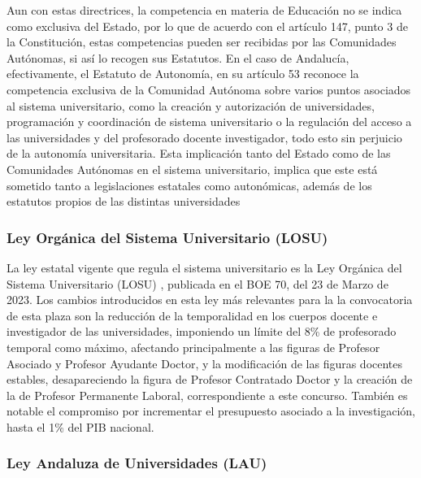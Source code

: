 \documentclass[a4paper,12pt,twoside]{article}
\begin{document}
Aun con estas directrices, la competencia en materia de Educación no se indica como exclusiva del Estado, por lo que de acuerdo con el artículo 147, punto 3 de la Constitución, estas competencias pueden ser recibidas por las Comunidades Autónomas, si así lo recogen sus Estatutos. En el caso de Andalucía, efectivamente, el Estatuto de Autonomía, en su artículo 53 reconoce la competencia exclusiva de la Comunidad Autónoma sobre varios puntos asociados al sistema universitario, como la creación y autorización de universidades, programación y coordinación de sistema universitario o la regulación del acceso a las universidades y del profesorado docente investigador, todo esto sin perjuicio de la autonomía universitaria. Esta implicación tanto del Estado como de las Comunidades Autónomas en el sistema universitario, implica que este está sometido tanto a legislaciones estatales como autonómicas, además de los estatutos propios de las distintas universidades

\subsubsection{Ley Orgánica del Sistema Universitario (LOSU)}

La ley estatal vigente que regula el sistema universitario es la Ley Orgánica del Sistema Universitario (LOSU) \cite{losu}, publicada en el BOE 70, del 23 de Marzo de 2023. Los cambios introducidos en esta ley más relevantes para la la convocatoria de esta plaza son la reducción de la temporalidad en los cuerpos docente e investigador de las universidades, imponiendo un límite del 8\% de profesorado temporal como máximo, afectando principalmente a las figuras de Profesor Asociado y Profesor Ayudante Doctor, y la modificación de las figuras docentes estables, desapareciendo la figura de Profesor Contratado Doctor y la creación de la de Profesor Permanente Laboral, correspondiente a este concurso. También es notable el compromiso por incrementar el presupuesto asociado a la investigación, hasta el 1\% del PIB nacional.

\subsubsection{Ley Andaluza de Universidades (LAU)}
\end{document}
